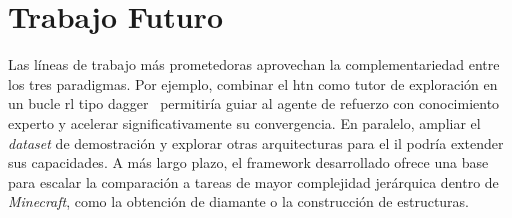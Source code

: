 \section{Trabajo Futuro}
\label{sec:conclu-futuro}
Las líneas de trabajo más prometedoras aprovechan la complementariedad entre los tres
paradigmas. Por ejemplo, combinar el \gls{htn} como tutor de exploración en un bucle \gls{rl} tipo
\gls{dagger}~\cite{DBLP:journals/jmlr/RossGB11} permitiría guiar al agente de refuerzo con conocimiento
experto y acelerar significativamente su convergencia. En paralelo, ampliar el \textit{dataset} de
demostración y explorar otras arquitecturas para el \gls{il} podría extender sus capacidades.
A más largo plazo, el \gls{framework} desarrollado
ofrece una base para escalar la comparación a tareas de mayor complejidad jerárquica dentro de
\textit{Minecraft}, como la obtención de diamante o la construcción de estructuras.